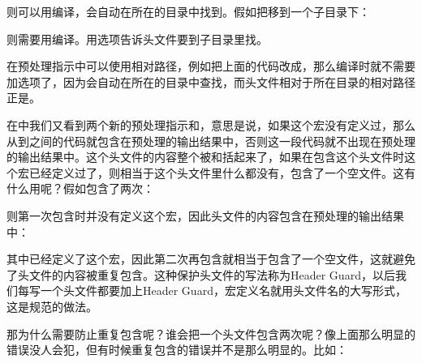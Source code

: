 则可以用编译，会自动在所在的目录中找到。假如把移到一个子目录下：




则需要用编译。用选项告诉头文件要到子目录里找。



在预处理指示中可以使用相对路径，例如把上面的代码改成，那么编译时就不需要加选项了，因为会自动在所在的目录中查找，而头文件相对于所在目录的相对路径正是。



在中我们又看到两个新的预处理指示和，意思是说，如果这个宏没有定义过，那么从到之间的代码就包含在预处理的输出结果中，否则这一段代码就不出现在预处理的输出结果中。这个头文件的内容整个被和括起来了，如果在包含这个头文件时这个宏已经定义过了，则相当于这个头文件里什么都没有，包含了一个空文件。这有什么用呢？假如包含了两次：




则第一次包含时并没有定义这个宏，因此头文件的内容包含在预处理的输出结果中：




其中已经定义了这个宏，因此第二次再包含就相当于包含了一个空文件，这就避免了头文件的内容被重复包含。这种保护头文件的写法称为Header Guard，以后我们每写一个头文件都要加上Header Guard，宏定义名就用头文件名的大写形式，这是规范的做法。



那为什么需要防止重复包含呢？谁会把一个头文件包含两次呢？像上面那么明显的错误没人会犯，但有时候重复包含的错误并不是那么明显的。比如：


